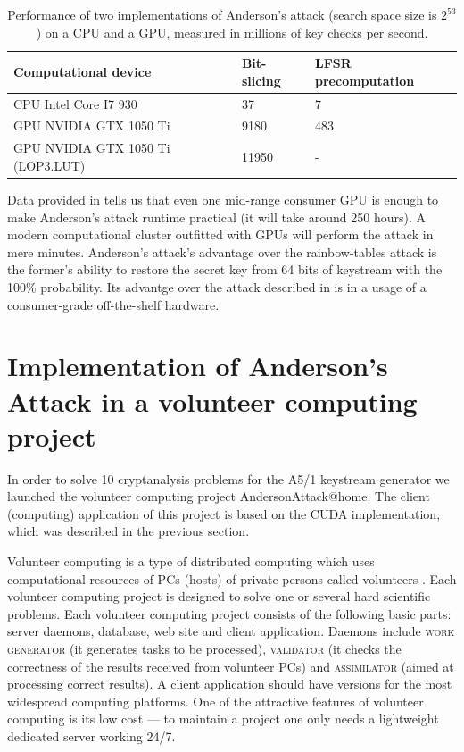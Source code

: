 \documentclass[runningheads,a4paper]{llncs}[2015/06/24]
\begin{document}
\begin{table} 
	\caption{Performance of two implementations of
	Anderson's attack (search space size is $2^{53}$) on a CPU and a GPU, measured
	in millions of key checks per second.} 
	\label{tab:gpuspeed}
	\begin {center} 
	\begin{tabular} {| l | l | l |} 
	\hline Computational device & Bit-slicing &
		LFSR precomputation \\ 
		\hline
		\hline CPU Intel Core I7 930 & 37 & 7
		\\ 
		\hline GPU NVIDIA GTX 1050 Ti & 9180 & 483 \\ 
		\hline GPU NVIDIA GTX
		1050 Ti (LOP3.LUT) & 11950 & - \\ \hline
	\end{tabular}
\end {center}
\end{table}

Data provided in  tells us that even one mid-range
consumer GPU is enough to make Anderson's attack runtime practical (it
will take around 250 hours). A modern computational cluster outfitted with GPUs
will perform the attack in mere minutes. Anderson's attack's
advantage over the rainbow-tables attack \cite{Nohl2010} is the former's ability
to restore the secret key from 64 bits of keystream with the 100\% probability.
Its advantge over the attack described in \cite{DBLP:conf/ches/GendrullisNR08} is in a usage of a
consumer-grade off-the-shelf hardware.

\section{Implementation of Anderson's Attack in a volunteer computing
project}
\label{sec:boinc}

In order to solve 10 cryptanalysis problems for the A5/1 keystream generator we
launched the volunteer computing project AndersonAttack@home. The client (computing)
application of this project is based on the CUDA implementation, which was
described in the previous section.

Volunteer computing is a type of distributed computing which uses computational resources of PCs (hosts) of private persons called volunteers \cite{DBLP:conf/ccgrid/AndersonF06}. Each volunteer computing project is designed to solve one or several hard scientific problems. Each volunteer computing project consists of the following basic parts: server daemons, database, web site and client application. Daemons include \textsc{work generator} (it generates tasks to be processed), \textsc{validator} (it checks the correctness of the results received from volunteer PCs) and
\textsc{assimilator} (aimed at processing correct results). A client application should
have versions for the most widespread computing platforms. One of the attractive
features of volunteer computing is its low cost --- to maintain a project one
only needs a lightweight dedicated server working 24/7.
\end{document}
